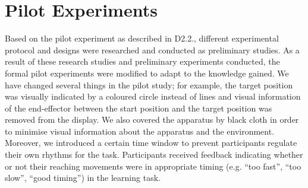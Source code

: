 \section{Pilot Experiments}
Based on the pilot experiment as described in D2.2., different experimental protocol and designs were researched and conducted as preliminary studies. As a result of these research studies and preliminary experiments conducted, the formal pilot experiments were modified to adapt to the knowledge gained. We have changed several things in the pilot study; for example, the target position was visually indicated by a coloured circle instead of lines and visual information of the end-effector between the start position and the target position was removed from the display. We also covered the apparatus by black cloth in order to minimise visual information about the apparatus and the environment. Moreover, we introduced a certain time window to prevent participants regulate their own rhythms for the task. Participants received feedback indicating whether or not their reaching movements were in appropriate timing (e.g. “too fast”, “too slow”, “good timing”) in the learning task.

